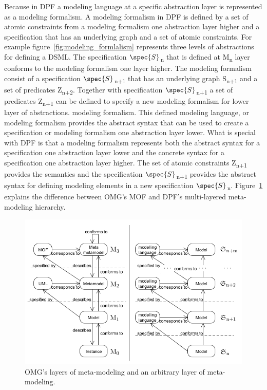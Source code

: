 Because in DPF a modeling language at a specific abstraction layer is
represented as a modeling formalism.
A modeling formalism in DPF is defined by a set of atomic constraints from a
modeling formalism one abstraction layer higher and a specification that has an
underlying graph and a set of atomic constraints. For example figure~\ref{fig:modeling_formlalism} represents three levels of
abstractions for defining a DSML. The specification $\spec{S}$\textsubscript{n}
that is defined at M\textsubscript{n} layer conforms to the modeling
formalism one layer higher. The modeling formalism consist of a specification
$\spec{S}$\textsubscript{n+1} that has an underlying graph S\textsubscript{n+1}
and a set of predicates Z\textsubscript{n+2}. Together with specification
$\spec{S}$\textsubscript{n+1} a set of predicates Z\textsubscript{n+1} can be
defined to specify a new modeling formalism for lower layer of abstractions. 
modeling formalism\cite{Rutle_thesis}. This defined modeling language, or
modeling formalism provides the abstract syntax that can be used to create a
specification or modeling formalism one abstraction layer lower. What is special
with DPF is that a modeling formalism represents both the abstract syntax for
a specification one abstraction layer lower and the concrete syntax for a
specification one abstraction layer higher. The set of atomic constraints
Z\textsubscript{n+1} provides the semantics and the
specification $\spec{S}$\textsubscript{n+1} provides the abstract syntax for
defining modeling elements in a new specification $\spec{S}$\textsubscript{n}.
Figure~\ref{fig:MOF_vs_DPF} explains the difference between OMG's MOF and DPF's
multi-layered meta-modeling hierarchy.

\begin{figure}[H]
	\centering
	\includegraphics[scale=0.7]{./Figures/MOF_vs_DPF}
	\caption[OMG's layers of meta-modeling and multilayer modeling]
	{OMG's layers of meta-modeling and an arbitrary layer of meta-modeling.}
	\label{fig:MOF_vs_DPF}
\end{figure}

